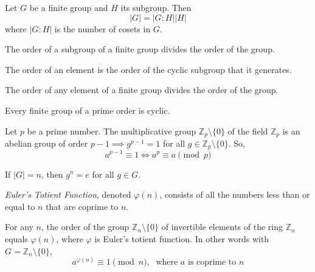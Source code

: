 \documentclass{article}
\begin{document}
  \begin{theorem}
    Let $G$ be a finite group and $H$ its subgroup. Then 
    \[ |G| = |G:H| |H|\]
    where $|G:H|$ is the number of cosets in $G$. 
  \end{theorem}

  \begin{corollary}
    The order of a subgroup of a finite group divides the order of the group. 
  \end{corollary}

  \begin{definition}
    The order of an element is the order of the cyclic subgroup that it generates. 
  \end{definition}

  \begin{corollary}
    The order of any element of a finite group divides the order of the group. 
  \end{corollary}

  \begin{corollary}
    Every finite group of a prime order is cyclic. 
  \end{corollary}

  \begin{theorem}
    Let $p$ be a prime number. The multiplicative group $\mathbb{Z}_{p} \setminus \{0\}$ of the field $\mathbb{Z}_{p}$ is an abelian group of order $p-1 \implies g^{p-1} = 1$ for all $g \in \mathbb{Z}_{p} \setminus \{0\}$. So,
    \[ a^{p-1} \equiv 1 \iff a^{p} \equiv a \pmod{p} \]
  \end{theorem}

  \begin{corollary}
    If $|G| = n$, then $g^{n} = e$ for all $g \in G$. 
  \end{corollary}

  \begin{definition}
    \textit{Euler's Totient Function}, denoted $\varphi(n)$, consists of all the numbers less than or equal to $n$ that are coprime to $n$. 
  \end{definition}

  \begin{theorem}
    For any $n$, the order of the group $\mathbb{Z}_{n} \setminus \{0\}$ of invertible elements of the ring $\mathbb{Z}_{n}$ equals $\varphi(n)$, where $\varphi$ is Euler's totient function. In other words with $G = \mathbb{Z}_{n} \setminus \{0\}$, 
    \[ a^{\varphi(n)} \equiv 1 \pmod{n}, \; \text{ where $a$ is coprime to $n$}\]
  \end{theorem}
\end{document}
